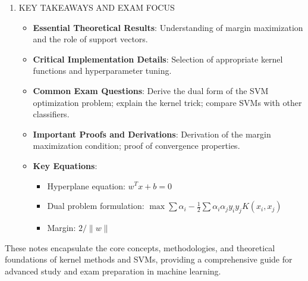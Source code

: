 \documentclass[
  12pt,
]{report}
\providecommand{\tightlist}{%
  \setlength{\itemsep}{0pt}\setlength{\parskip}{0pt}}
\begin{document}
\begin{enumerate}
  \begin{itemize}
  \tightlist
  \item
    \textbf{Example}: Handwritten digit classification using SVM with a polynomial kernel.
  \item
    \textbf{Implementation Variations}: Different kernels (linear, polynomial, RBF) can be applied based on domain-specific requirements.
  \item
    \textbf{Performance Comparisons}: SVMs are often compared with other classifiers like neural networks and decision trees in terms of accuracy and computational efficiency.
  \item
    \textbf{Limitations}: SVMs can be computationally expensive with large datasets and require careful kernel selection.
  \end{itemize}
\item
  KEY TAKEAWAYS AND EXAM FOCUS

  \begin{itemize}
  \tightlist
  \item
    \textbf{Essential Theoretical Results}: Understanding of margin maximization and the role of support vectors.
  \item
    \textbf{Critical Implementation Details}: Selection of appropriate kernel functions and hyperparameter tuning.
  \item
    \textbf{Common Exam Questions}: Derive the dual form of the SVM optimization problem; explain the kernel trick; compare SVMs with other classifiers.
  \item
    \textbf{Important Proofs and Derivations}: Derivation of the margin maximization condition; proof of convergence properties.
  \item
    \textbf{Key Equations}:

    \begin{itemize}
    \tightlist
    \item
      Hyperplane equation: \(w^T x + b = 0\)
    \item
      Dual problem formulation: \(\max \sum \alpha_i - \frac{1}{2} \sum \alpha_i \alpha_j y_i y_j K(x_i, x_j)\)
    \item
      Margin: \(2 / \|w\|\)
    \end{itemize}
  \end{itemize}
\end{enumerate}

These notes encapsulate the core concepts, methodologies, and theoretical foundations of kernel methods and SVMs, providing a comprehensive guide for advanced study and exam preparation in machine learning.
\end{document}
